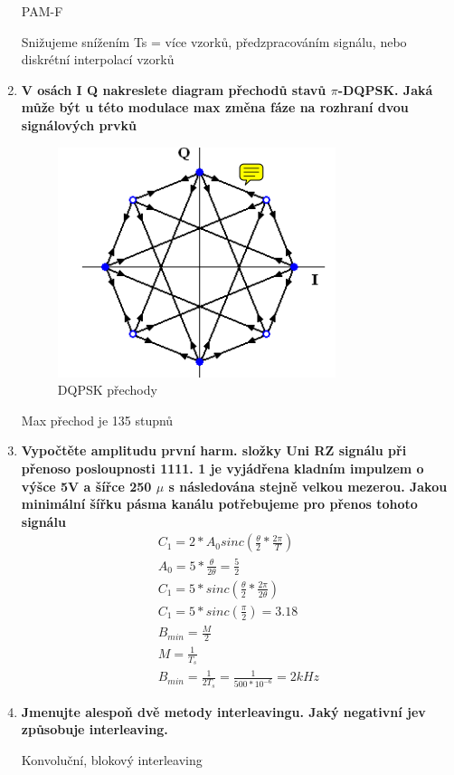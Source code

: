 \begin{enumerate}
    PAM-F
    
    Snižujeme snížením Ts = více vzorků, předzpracováním signálu, nebo diskrétní interpolací vzorků

    \item \textbf{V osách I Q nakreslete diagram přechodů stavů $\pi$-DQPSK. Jaká může být u této modulace max změna fáze na rozhraní dvou signálových prvků}
    \begin{figure}[h!]
        \centering
        \includegraphics{images/DQPSK.png}
        \caption{DQPSK přechody}
        \label{fig:enter-label}
    \end{figure}
    
    Max přechod je 135 stupnů

    \item \textbf{Vypočtěte amplitudu první harm. složky Uni RZ signálu při přenoso posloupnosti 1111. 1 je vyjádřena kladním impulzem o výšce 5V a šířce 250 $\mu$ s následována stejně velkou mezerou. Jakou minimální šířku pásma kanálu potřebujeme pro přenos tohoto signálu}
    \begin{gather*}
        C_1=2*A_0sinc(\frac{\theta}{2}*\frac{2\pi}{T})\\
        A_0=5*\frac{\theta}{2\theta}=\frac{5}{2}\\
        C_1=5*sinc(\frac{\theta}{2}*\frac{2\pi}{2\theta})\\
        C_1=5*sinc(\frac{\pi}{2})= 3.18 \\
        B_{min}=\frac{M}{2}\\
        M=\frac{1}{T_s}\\
        B_{min}=\frac{1}{2T_s}=\frac{1}{500*10^{-6}}=2kHz
    \end{gather*}
    \item \textbf{Jmenujte alespoň dvě metody interleavingu. Jaký negativní jev způsobuje interleaving.}

    Konvoluční, blokový interleaving


\end{enumerate}
